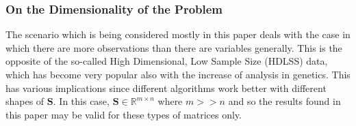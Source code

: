 \documentclass[11pt,a4paper]{article}
\newcommand{\inreal}{\in \mathbb{R}}
\newcommand{\smat}{\mathbf{S}}
\begin{document}







\subsubsection{On the Dimensionality of the Problem}
The scenario which is being considered mostly in this paper deals with the case in which there are more observations than there are variables generally. This is the opposite of the so-called High Dimensional, Low Sample Size (HDLSS) data, which has become very popular also with the increase of analysis in genetics. This has various implications since different algorithms work better with different shapes of $\smat$. In this case, $\smat \inreal^{m\times n}$ where $m >> n$ and so the results found in this paper may be valid for these types of matrices only. 
\end{document}
